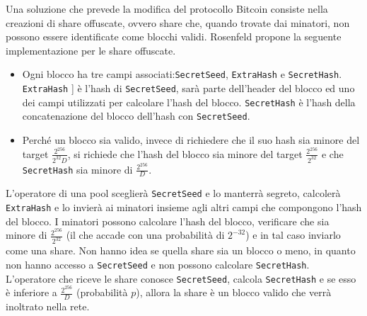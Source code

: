 Una soluzione che prevede la modifica del protocollo Bitcoin consiste nella creazioni di share offuscate, ovvero share che, quando trovate dai minatori, non possono essere identificate come blocchi validi.    Rosenfeld propone la seguente implementazione per le share offuscate.
\begin{itemize}
    \item Ogni blocco ha tre campi associati:\verb|SecretSeed|, \verb|ExtraHash| e \verb|SecretHash|. \verb|ExtraHash| ] è l'hash di \verb|SecretSeed|, sarà parte dell'header del blocco ed uno dei campi utilizzati per calcolare l'hash del blocco. \verb|SecretHash| è l'hash della concatenazione del blocco dell'hash con \verb|SecretSeed|.
    \item Perché un blocco sia valido, invece di richiedere che il suo hash sia minore del target $\frac{2^{256}}{2^{32} D}$, si richiede che l'hash del blocco sia minore del target $\frac{2^{256}}{2^{32}}$ e che \verb|SecretHash| sia minore di $\frac{2^{256}}{D}$.
\end{itemize}
L'operatore di una pool sceglierà \verb|SecretSeed| e lo manterrà segreto, calcolerà \verb|ExtraHash| e lo invierà ai minatori insieme agli altri campi che compongono l'hash del blocco. I minatori possono calcolare l'hash del blocco, verificare che sia minore di $\frac{2^{256}}{2^{32}}$ (il che accade con una probabilità di $2^{-32}$) e in tal caso inviarlo come una share. Non hanno idea se quella share sia un blocco o meno, in quanto non hanno accesso a \verb|SecretSeed| e non possono calcolare \verb|SecretHash|. L'operatore che riceve le share conosce \verb|SecretSeed|, calcola \verb|SecretHash| e se esso è inferiore a $\frac{2^{256}}{D}$ (probabilità $p$), allora la share è un blocco valido che verrà inoltrato nella rete.


